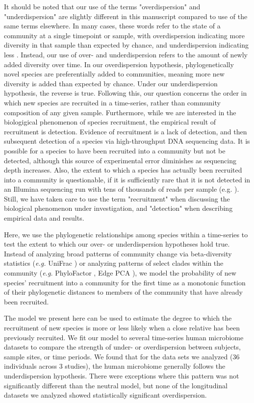 \documentclass{article}
\begin{document}
It should be noted that our use of the terms "overdispersion" and "underdispersion" are slightly different in this manuscript compared to use of the same terms elsewhere. In many cases, these words refer to the state of a community at a single timepoint or sample, with overdispersion indicating more diversity in that sample than expected by chance, and underdispersion indicating less \cite{Webb2002}. Instead, our use of over- and underdispersion refers to the amount of newly added diversity over time. In our overdispersion hypothesis, phylogenetically novel species are preferentially added to communities, meaning more new diversity is added than expected by chance. Under our underdispersion hypothesis, the reverse is true. Following this, our question concerns the order in which new species are recruited in a time-series, rather than community composition of any given sample. Furthermore, while we are interested in the biologigical phenomenon of species recruitment, the empirical result of recruitment is detection. Evidence of recruitment is a lack of detection, and then subsequent detection of a species via high-throughput DNA sequencing data. It is possible for a species to have been recruited into a community but not be detected, although this source of experimental error diminishes as sequencing depth increases. Also, the extent to which a species has actually been recruited into a community is questionable, if it is sufficiently rare that it is not detected in an Illumina sequencing run with tens of thousands of reads per sample (e.g. \cite{Yassour2016}). Still, we have taken care to use the term "recruitment" when discussing the biological phenomenon under investigation, and "detection" when describing empirical data and results. 
\par
Here, we use the phylogenetic relationships among species within a time-series to test the extent to which our over- or underdispersion hypotheses hold true. Instead of analyzing broad patterns of community change via beta-diversity statistics (\emph{e.g.} UniFrac \cite{Lozupone2005}) or analyzing patterns of select clades within the community (\emph{e.g.} PhyloFactor \cite{Washburne2017}, Edge PCA \cite{Matsen2013}), we model the probability of new species' recruitment into a community for the first time as a monotonic function of their phylogenetic distances to members of the community that have already been recruited. 
\par
The model we present here can be used to estimate the degree to which the recruitment of new species is more or less likely when a close relative has been previously recruited. We fit our model to several time-series human microbiome datasets \cite{Caporaso2011,Koenig2011,Yassour2016} to compare the strength of under- or overdispersion between subjects, sample sites, or time periods. We found that for the data sets we analyzed (36 individuals across 3 studies), the human microbiome generally follows the underdispersion hypothesis. There were exceptions where this pattern was not significantly different than the neutral model, but none of the longitudinal datasets we analyzed showed statistically significant overdispersion. 
\\\par
\end{document}
